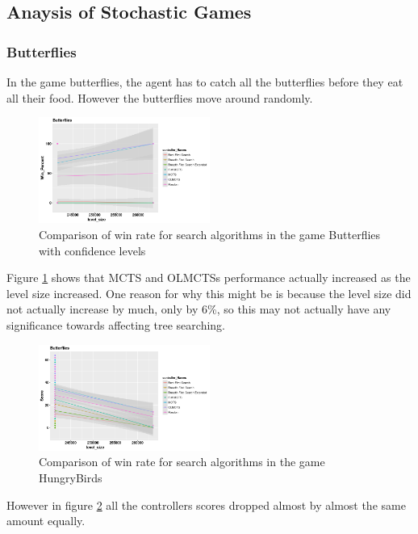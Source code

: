 \documentclass[journal]{IEEEtran}
\begin{document}
	 \subsection{Anaysis of Stochastic Games} \label{AoSG}
		\subsubsection{Butterflies}
		In the game butterflies, the agent has to catch all the butterflies before they eat all their food. However the butterflies move around randomly.

		\begin{figure}[h]
		    \centering
		    \includegraphics[width=0.5\textwidth]{Scatter/game_11_name_confidence}
		    \caption{ Comparison of win rate for search algorithms in the game Butterflies with confidence levels }
		    \label{fig:game_11_win}
		\end{figure}
		Figure \ref{fig:game_11_win} shows that MCTS and OLMCTSs performance actually increased as the level size increased. One reason for why this might be is because the level size did not actually increase by much, only by 6\%, so this may not actually have any significance towards affecting tree searching.

		\begin{figure}[h]
		    \centering
		    \includegraphics[width=0.5\textwidth]{Scatter/game_11_score_confidence}
		    \caption{ Comparison of win rate for search algorithms in the game HungryBirds }
		    \label{fig:game_11_score_confidence}
		\end{figure}
		However in figure \ref{fig:game_11_score_confidence} all the controllers scores dropped almost by almost the same amount equally.
		
\end{document}
